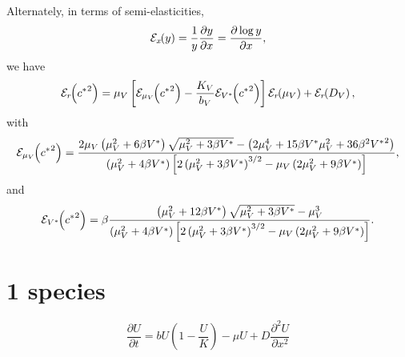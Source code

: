 \documentclass{jpmarticle}
\newcommand{\elasticity}[2]{\mathcal{E}_{#2}\negthickspace\left({#1}\right)}
\begin{document}
Alternately, in terms of semi-elasticities,
\begin{equation}
  \elasticity{y}{x}
  = \frac{1}{y} \frac{\partial y}{\partial x}
  = \frac{\partial \log y}{\partial x},
\end{equation}
we have
\begin{equation}
  \elasticity{{c^*}^2}{r}
  =
  \mu_V \left[
    \elasticity{{c^*}^2}{\mu_V}
    - \frac{K_V}{b_V} \elasticity{{c^*}^2}{V^*}
  \right]
  \elasticity{\mu_V}{r}
  +
  \elasticity{D_V}{r},
\end{equation}
with
\begin{equation}
  \elasticity{{c^*}^2}{\mu_V}
  =
  \frac{
    2 \mu_V \left(\mu_V^2 + 6 \beta V^*\right)
    \sqrt{\mu_V^2 + 3 \beta V^*}
    - \left(
      2 \mu_V^4
      + 15 \beta V^* \mu_V^2
      + 36 \beta^2 {V^*}^2
    \right)
  }
  {\left(\mu_V^2 + 4 \beta V^*\right)
    \left[2 \left(\mu_V^2 + 3 \beta V^*\right)^{3/2}
      - \mu_V \left(2 \mu_V^2 + 9 \beta V^*\right)\right]},
\end{equation}
and
\begin{equation}
  \elasticity{{c^*}^2}{V^*}
  =
  \beta
  \frac{\left(\mu_V^2 + 12 \beta V^*\right)
    \sqrt{\mu_V^2 + 3 \beta V^*} - \mu_V^3}
  {\left(\mu_V^2 + 4 \beta V^*\right)
    \left[2 \left(\mu_V^2 + 3 \beta V^*\right)^{3/2}
      - \mu_V \left(2 \mu_V^2 + 9 \beta V^*\right)\right]}.
\end{equation}


\section{1 species}

\begin{equation}
  \frac{\partial U}{\partial t}
  = b U \left(1 - \frac{U}{K}\right)
  - \mu U
  + D \frac{\partial^2 U}{\partial x^2}
\end{equation}
  
\end{document}
